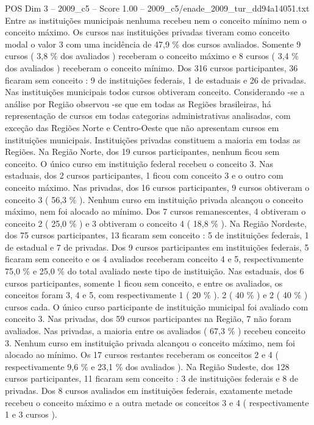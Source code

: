 \begin{textsample}{POS Dim 3 – 2009\_c5 – Score 1.00 – 2009\_c5/enade\_2009\_tur\_dd94a14051.txt}
Entre as instituições municipais nenhuma recebeu nem o conceito mínimo nem o conceito máximo.
Os cursos nas instituições privadas tiveram como conceito modal o valor 3 com uma incidência de 47,9 \% dos cursos avaliados.
Somente 9 cursos ( 3,8 \% dos avaliados ) receberam o conceito máximo e 8 cursos ( 3,4 \% dos avaliados ) receberam o conceito mínimo.
Dos 316 cursos participantes, 36 ficaram sem conceito : 9 de instituições federais, 1 de estaduais e 26 de privadas.
Nas instituições municipais todos cursos obtiveram conceito.
Considerando -se a análise por Região observou -se que em todas as Regiões brasileiras, há representação de cursos em todas categorias administrativas analisadas, com exceção das Regiões Norte e Centro-Oeste que não apresentam cursos em instituições municipais.
Instituições privadas constituem a maioria em todas as Regiões.
Na Região Norte, dos 19 cursos participantes, nenhum ficou sem conceito.
O único curso em instituição federal recebeu o conceito 3.
Nas estaduais, dos 2 cursos participantes, 1 ficou com conceito 3 e o outro com conceito máximo.
Nas privadas, dos 16 cursos participantes, 9 cursos obtiveram o conceito 3 ( 56,3 \% ).
Nenhum curso em instituição privada alcançou o conceito máximo, nem foi alocado ao mínimo.
Dos 7 cursos remanescentes, 4 obtiveram o conceito 2 ( 25,0 \% ) e 3 obtiveram o conceito 4 ( 18,8 \% ).
Na Região Nordeste, dos 75 cursos participantes, 13 ficaram sem conceito : 5 de instituições federais, 1 de estadual e 7 de privadas.
Dos 9 cursos participantes em instituições federais, 5 ficaram sem conceito e os 4 avaliados receberam conceito 4 e 5, respectivamente 75,0 \% e 25,0 \% do total avaliado neste tipo de instituição.
Nas estaduais, dos 6 cursos participantes, somente 1 ficou sem conceito, e entre os avaliados, os conceitos foram 3, 4 e 5, com respectivamente 1 ( 20 \% ). 2 ( 40 \% ) e 2 ( 40 \% ) cursos cada.
O único curso participante de instituição municipal foi avaliado com conceito 3.
Nas privadas, dos 59 cursos participantes na Região, 7 não foram avaliados.
Nas privadas, a maioria entre os avaliados ( 67,3 \% ) recebeu conceito 3.
Nenhum curso em instituição privada alcançou o conceito máximo, nem foi alocado ao mínimo.
Os 17 cursos restantes receberam os conceitos 2 e 4 ( respectivamente 9,6 \% e 23,1 \% dos avaliados ).
Na Região Sudeste, dos 128 cursos participantes, 11 ficaram sem conceito : 3 de instituições federais e 8 de privadas.
Dos 8 cursos avaliados em instituições federais, exatamente metade recebeu o conceito máximo e a outra metade os conceitos 3 e 4 ( respectivamente 1 e 3 cursos ).

\end{textsample}
